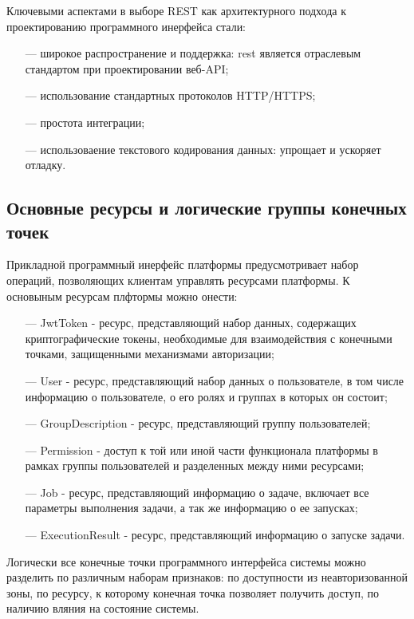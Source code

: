 Ключевыми аспектами в выборе REST как архитектурного подхода к проектированию программного инерфейса стали:

\begin{itemize}
  \item[---] широкое распространение и поддержка: rest является отраслевым стандартом при проектировании веб-API;
  \item[---] использование стандартных протоколов HTTP/HTTPS;
  \item[---] простота интеграции;
  \item[---] использоваение текстового кодирования данных: упрощает и ускоряет отладку. 
\end{itemize}

\subsection{Основные ресурсы и логические группы конечных точек}

Прикладной программный инерфейс платформы предусмотривает набор операций, позволяющих клиентам управлять ресурсами платформы.
К основыным ресурсам плфтормы можно онести:

\begin{itemize}
  \item[---] JwtToken - ресурс, представляющий набор данных, содержащих криптографические токены, необходимые для взаимодействия с конечными точками, защищенными механизмами авторизации;
  \item[---] User - ресурс, представляющий набор данных о пользователе, в том числе информацию о пользователе, о его ролях и группах в которых он состоит;
  \item[---] GroupDescription - ресурс, представляющий группу пользователей;
  \item[---] Permission - доступ к той или иной части функционала платформы в рамках группы пользователей и разделенных между ними ресурсами; 
  \item[---] Job - ресурс, представляющий информацию о задаче, включает все параметры выполнения задачи, а так же информацию о ее запусках;
  \item[---] ExecutionResult - ресурс, представляющий информацию о запуске задачи. 
\end{itemize}

Логически все конечные точки программного интерфейса системы можно разделить по различным наборам признаков: по доступности из неавторизованной зоны, по ресурсу, к которому конечная точка позволяет получить доступ, по наличию вляния на состояние системы.

